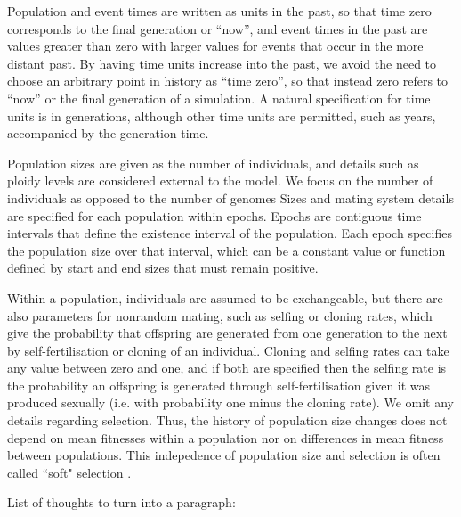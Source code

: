 \documentclass[11pt]{article}
\begin{document}
Population and event times are written as units in the past, so that time zero
corresponds to the final generation or ``now'', and event times in the past are
values greater than zero with larger values for events that occur in the more
distant past. By having time units increase into the past, we avoid the need to
choose an arbitrary point in history as ``time zero'', so that instead zero
refers to ``now'' or the final generation of a simulation. A natural
specification for time units is in generations, although other time units are
permitted, such as years, accompanied by the generation time.

Population sizes are given as the number of individuals, and details
such as ploidy levels are considered external to the model.
We focus on the number of individuals as opposed to the number of genomes
Sizes and mating system details are specified for each population within
epochs.
Epochs are contiguous time intervals that define
the existence interval of the population. Each epoch specifies the population size
over that interval, which can be a constant value or function defined by start
and end sizes that must remain positive.

Within a population, individuals are assumed to be exchangeable, but there are
also parameters for nonrandom mating, such as selfing or cloning rates, which
give the probability that offspring are generated from one generation to the
next by self-fertilisation or cloning of an individual. Cloning and selfing
rates can take any value between zero and one, and if both are specified then
the selfing rate is the probability an offspring is generated through
self-fertilisation given it was produced sexually (i.e. with probability one
minus the cloning rate). We omit any details regarding selection.
Thus, the history of population size changes does not depend on mean fitnesses within
a population nor on differences in mean fitness between populations.
This indepedence of population size and
selection is often called ``soft" selection \citep{christiansen1975hard}.

List of thoughts to turn into a paragraph:
\end{document}
